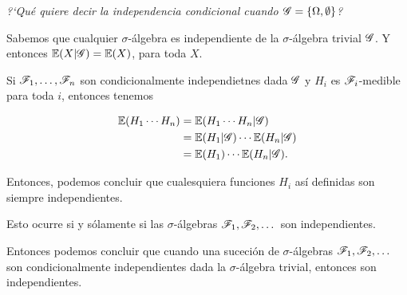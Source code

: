 ﻿\emph{
	?`Qu\'e quiere decir la independencia condicional cuando $\mathscr{G}=\left\{  \Omega ,\emptyset\right\} $?
}
\afterstatement\pn

Sabemos que cualquier $\sigma$-álgebra es
independiente de la $\sigma$-álgebra trivial $\mathscr{G}$. Y entonces $\mathbb{E}(X | \mathscr{G}) = \mathbb{E}(X)$, para toda $X$.\pn

Si $\mathscr{F}_1, \dots, \mathscr{F}_n$ son condicionalmente independietnes dada $\mathscr{G}$ y $H_i$ es $\mathscr{F}_i$-medible para toda $i$, entonces tenemos

\begin{align}
    \mathbb{E}(H_1 \cdots H_n) &=  \mathbb{E}(H_1 \cdots H_n | \mathscr{G})            \\
                        &=  \mathbb{E}(H_1 | \mathscr{G}) \cdots \mathbb{E}(H_n | \mathscr{G})    \\
                        &=  \mathbb{E}(H_1) \cdots  \mathbb{E}(H_n | \mathscr{G}).
\end{align}

Entonces, podemos concluir que cualesquiera funciones $H_i$ así definidas son siempre
independientes.\pn

Esto ocurre si y sólamente si las $\sigma$-álgebras $\mathscr{F}_1, \mathscr{F}_2,\dots$ son independientes.\pn

Entonces podemos concluir que cuando una suceción de $\sigma$-álgebras $\mathscr{F}_1, \mathscr{F}_2,\dots$ son condicionalmente independientes
dada la $\sigma$-álgebra trivial, entonces son independientes.